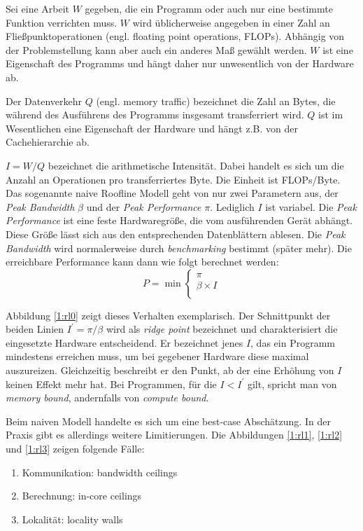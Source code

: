 		Sei eine \Gls{Arbeit} $W$ gegeben, die ein Programm oder auch nur eine bestimmte Funktion verrichten muss. $W$ wird üblicherweise angegeben in einer Zahl an Fließpunktoperationen (engl. floating point operations, FLOPs). Abhängig von der Problemstellung kann aber auch ein anderes Maß gewählt werden. $W$ ist eine Eigenschaft des Programms und hängt daher nur unwesentlich von der Hardware ab.
		
		Der \Gls{Datenverkehr} $Q$ (engl. memory traffic) bezeichnet die Zahl an Bytes, die während des Ausführens des Programms insgesamt transferriert wird. $Q$ ist im Wesentlichen eine Eigenschaft der Hardware und hängt z.B. von der Cachehierarchie ab.

		$I = W/Q$ bezeichnet die \gls{arithmetische Intensität}. Dabei handelt es sich um die Anzahl an Operationen pro transferriertes Byte. Die Einheit ist FLOPs/Byte.
		Das sogenannte naive Roofline Modell geht von nur zwei Parametern aus, der \textit{\Gls{Peak Bandwidth}} $\beta$ und der \textit{\Gls{Peak Performance}} $\pi$. Lediglich $I$ ist variabel. Die \textit{\Gls{Peak Performance}} ist eine feste Hardwaregröße, die vom ausführenden Gerät abhängt. Diese Größe lässt sich aus den entsprechenden Datenblättern ablesen. Die \textit{\Gls{Peak Bandwidth}} wird normalerweise durch \textit{benchmarking} bestimmt (später mehr). Die erreichbare \Gls{Performance} kann dann wie folgt berechnet werden:
		\begin{equation}
			P = \min \left\{ \begin{array}{ll} \pi \\
			\beta\times I \\ \end{array}\right.
		\end{equation}
		
		Abbildung \ref{1:rl0} zeigt dieses Verhalten exemplarisch. Der Schnittpunkt der beiden Linien $I^{\prime} = \pi/\beta$ wird als \textit{ridge point} bezeichnet und charakterisiert die eingesetzte Hardware entscheidend. Er bezeichnet jenes $I$, das ein Programm mindestens erreichen muss, um bei gegebener Hardware diese maximal auszureizen. Gleichzeitig beschreibt er den Punkt, ab der eine Erhöhung von $I$ keinen Effekt mehr hat. Bei Programmen, für die $I < I^{\prime}$ gilt, spricht man von \textit{memory bound}, andernfalls von \textit{compute bound}.
		
		Beim naiven Modell handelte es sich um eine best-case Abschätzung. In der Praxis gibt es allerdings weitere Limitierungen. Die Abbildungen \ref{1:rl1}, \ref{1:rl2} und \ref{1:rl3} zeigen folgende Fälle:
		
		\begin{enumerate}		
			\item Kommunikation: bandwidth ceilings
			\item Berechnung: in-core ceilings
			\item Lokalität: locality walls
		\end{enumerate}	